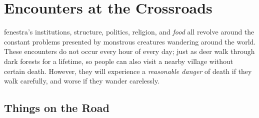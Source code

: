 \chapter{Encounters at the Crossroads}
\label{encounters}

\Gls{fenestra}'s institutions, structure, politics, religion, and \emph{food} all revolve around the constant problems presented by monstrous creatures wandering around the world.
These encounters do not occur every hour of every day; just as deer walk through dark forests for a lifetime, so people can also visit a nearby \gls{village} without certain death.
However, they will experience a \textit{reasonable danger} of death if they walk carefully, and worse if they wander carelessly.

\section{Things on the Road}

